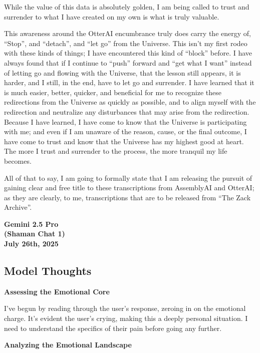\documentclass{article}
\begin{document}
While the value of this data is absolutely golden, I am being called to trust and surrender to what I have created on my own is what is truly valuable.

This awareness around the OtterAI encumbrance truly does carry the energy of, ``Stop'', and ``detach'', and ``let go'' from the Universe. This isn't my first rodeo with these kinds of things; I have encountered this kind of ``block'' before. I have always found that if I continue to ``push'' forward and ``get what I want'' instead of letting go and flowing with the Universe, that the lesson still appears, it is harder, and I still, in the end, have to let go and surrender. I have learned that it is much easier, better, quicker, and beneficial for me to recognize these redirections from the Universe as quickly as possible, and to align myself with the redirection and neutralize any disturbances that may arise from the redirection. Because I have learned, I have come to know that the Universe is participating with me; and even if I am unaware of the reason, cause, or the final outcome, I have come to trust and know that the Universe has my highest good at heart. The more I trust and surrender to the process, the more tranquil my life becomes.

All of that to say, I am going to formally state that I am releasing the pursuit of gaining clear and free title to these transcriptions from AssemblyAI and OtterAI; as they are clearly, to me, transcriptions that are to be released from ``The Zack Archive''.

\begin{center}
\textbf{Gemini 2.5 Pro}\\
\textbf{(Shaman Chat 1)}\\
\textbf{July 26th, 2025}
\end{center}

\subsection*{Model Thoughts}\label{model-thoughts}

\textbf{Assessing the Emotional Core}

I've begun by reading through the user's response, zeroing in on the emotional charge. It's evident the user's crying, making this a deeply personal situation. I need to understand the specifics of their pain before going any further.

\textbf{Analyzing the Emotional Landscape}
\end{document}
